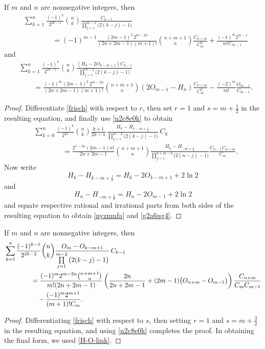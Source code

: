 \documentclass[12pt,reqno]{article}
\begin{document}
\begin{proposition}  
	If $m$ and $n$ are nonnegative integers, then
\begin{align}\label{nyznmfa}
&\sum_{k = 1}^n {\frac{{( - 1)^k }}{{2^{2k-1} }}\binom{{n}}{k}\frac{{C_{k-1} }}{{\prod\limits_{j = 1}^{m - 2} {\big( {2( {k - j}) - 1} \big)} }}}\nonumber\\
&\qquad\qquad  = (-1)^{m-1}\frac{(2m-1)^2\, 2^{m-2n}}{(2n+2m-1)(m+1)!} \binom{n + m + 1}{n}\frac{C_{n+m}}{C^2_{m}} + \frac{(-1)^m2^{m-1}}{m!C_{m-1}}
\end{align}	
and
\begin{align}\label{g2a6ug4}
&\sum_{k = 1}^n \frac{{( - 1)^k }}{2^{2k-1} }\binom{n}{k}\frac{( H_k  - 2O_{k - m + 1} )C_{k-1} }{\prod\limits_{j = 1}^{m - 2} {\big( {2( {k - j}) - 1} \big)}}\nonumber\\
&\qquad  = \frac{(-1)^m (2m-1)^2\,2^{m - 2n}}{(2n + 2m - 1)(m+1)!} \binom{n + m + 1}{n}  ( 2O_{m - 1}- H_n)\frac{C_{n +m}} {C_m^2} - \frac{(-2)^m }{m! }\frac{O_{m-1}}{C_{m-1}}.
	\end{align}
\end{proposition}
\begin{proof}
	Differentiate \eqref{frisch} with respect to $r$, then set $r=1$ and $s=m+\frac12$ in the resulting equation, and finally
	use \eqref{n2c8e0k} to obtain 
	\begin{align*}
	&\sum_{k =0}^{n} \frac{(-1)^k}{2^{2k}}\binom{n}{k} \frac{k+1}{2k-1}\,\frac{H_{k}-H_{k-m + \frac12}}{\prod\limits_{j=1}^{m-2}\big(2(k-j)-1\big)}\,C_k \\
	&\qquad\qquad=\frac{2^{1-3n}(2m-1)n!}{2n+2m-1}\binom{n+m+1}{n} \frac{H_n-H_{-m+\frac12}}{\prod\limits_{j=1}^{n+m-2}\big(2(n-j)-1\big)}\frac{C_{n-1}C_{n+m}}{C_{m}}.
	\end{align*}
Now write $$H_k  - H_{k - m + \frac12}  = H_k  - 2O_{k - m + 1}  + 2\ln 2$$ and $$H_n  - H_{ - m + \frac12}  = H_n  - 2O_{m - 1}  + 2\ln 2$$ and equate respective rational and irrational parts from both sides of the resulting equation to obtain \eqref{nyznmfa} and \eqref{g2a6ug4}.
\end{proof}
\begin{proposition} 
If $m$ and $n$ are nonnegative integers, then
\begin{align*}\label{hs6d8ge}
	&\sum_{k=1}^{n} \frac{(-1)^{k-1}}{2^{2k-2}}\binom{n}{k} \frac{O_m-O_{k-m+1}}{\prod\limits_{j=1}^{m-2}\big(2(k-j)-1\big)}\,C_{k-1}\notag \\
	&\qquad\qquad =\frac{(-1)^m 2^{m-2n}\binom{n+m+1}{n} }{m!(2n+2m-1)}
	\left(\frac{2n}{2n+2m-1} + (2m-1)\big(O_{n+m}-O_{m-1}\big)\right)\frac{C_{n+m}}{C_{m}C_{m-1}}\\
	&\qquad\qquad\quad-\frac{(-1)^m 2^{m+1}}{(m+1)!C_m}.
		\end{align*}
\end{proposition}
\begin{proof}
	Differentiating \eqref{frisch} with respect to $s$, then setting $r=1$ and $s=m+\frac32$ in the resulting equation, and using \eqref{n2c8e0k} completes the proof. In obtaining the final form, we used \eqref{H-O-link}.
\end{proof}
\end{document}
